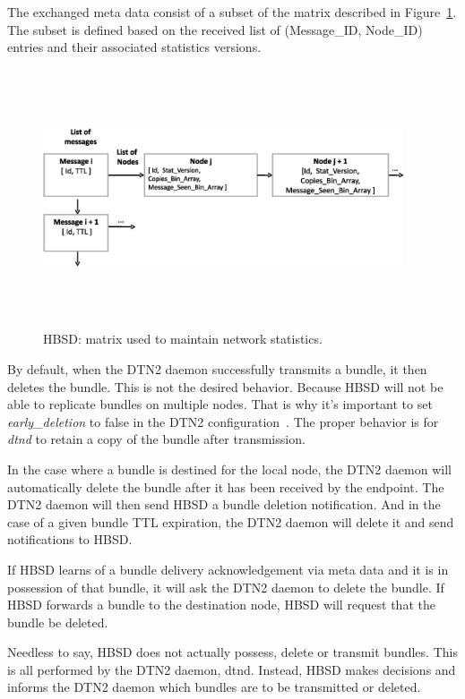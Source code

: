 The exchanged meta data consist of a subset of the matrix described in Figure~\ref{Stat-Mat}. The subset is defined based on the received list of (Message\_ID, Node\_ID) entries and their associated statistics versions.


\begin{figure}[!h]
\centering
\includegraphics[width=4.2in,height=3in]{Chapitre4/Stat_Matrix.eps}
\caption{HBSD: matrix used to maintain network statistics.}
\label{Stat-Mat}
\end{figure}

By default, when the DTN2 daemon successfully transmits a bundle, it then deletes the bundle. This is
not the desired behavior. Because HBSD will not be able to replicate bundles on
multiple nodes. That is why it's important to set \emph{early\_deletion} to false in the DTN2
configuration~\cite{HBSDDTN2}. The proper behavior is for \emph{dtnd} to retain a copy of the bundle after
transmission.

In the case where a bundle is destined for the local node, the DTN2 daemon will automatically delete
the bundle after it has been received by the endpoint. The DTN2 daemon will then send HBSD a
bundle deletion notification. And in the case of a given bundle TTL expiration, the DTN2 daemon will delete it and send notifications to HBSD.

If HBSD learns of a bundle delivery acknowledgement via meta data and it is in
possession of that bundle, it will ask the DTN2 daemon to delete the bundle.
If HBSD forwards a bundle to the destination node, HBSD will request that the bundle
be deleted.

Needless to say, HBSD does not actually possess, delete or transmit bundles. This is all
performed by the DTN2 daemon, dtnd. Instead, HBSD makes decisions and informs the DTN2 daemon which
bundles are to be transmitted or deleted.


